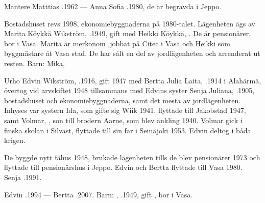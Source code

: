 Mantere Matttias .1962  ---  Anna Sofia .1980, de är begravda i Jeppo.






Bostadshuset revs 1998,  ekonomiebyggnaderna på 1980-talet. Lägenheten ägs av Marita Köykkä Wikström, .1949, gift med Heikki Köykkä, . De är pensionärer, bor i Vasa. Marita är merkonom ,jobbat på Citec i Vasa och Heikki som byggmästare åt Vasa stad. De har sålt en del av jordlägenheten och arrenderat ut resten.
Barn: Mika, 


Urho Edvin Wikström, .1916, gift 1947 med Bertta Julia Laita, .1914 i Alahärmä, övertog vid arvskiftet 1948 tillsammans med Edvins syster Senja Juliana, .1905, bostadshuset och ekonomiebyggnaderna, samt det mesta av jordlägenheten. Inhyses var systern Ida, som gifte sig Wiik 1941, flyttade till Jakobstad 1947, samt Volmar, , son till brodern Aarne, som blev änkling 1940. Volmar gick i finska skolan i Silvast, flyttade till sin far i Seinäjoki 1953. Edvin deltog i båda krigen.

De byggde nytt fähus 1948, brukade lägenheten tills de blev pensionärer 1973 och flyttade till pensionärshus i Jeppo. Edvin och Bertta flyttade till Vasa 1980. Senja .1991.

Edvin .1994  ---  Bertta .2007.
Barn: , .1949, gift , bor i Vasa.



